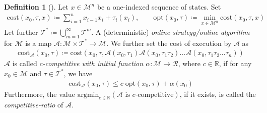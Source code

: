\documentclass[10pt]{amsart}
\theoremstyle{definition}
\newtheorem{definition}{Definition}
\theoremstyle{remark}
\begin{document}
    \begin{minipage}{0.33\linewidth}
        \centering
    \end{minipage}

    \begin{definition}[{\cite[p. 76]{Woeginger}}]
        Let \(x \in \mathcal{M}^n\) be a one-indexed sequence of states. Set
        \begin{align}
            \text{cost}(x_0, \tau, x) \coloneqq \sum_{i=1}^n x_{i-1}x_i + \tau_i(x_i), \qquad \text{opt}(x_0, \tau) \coloneqq \min_{x \in \mathcal{M}^n} \text{cost}(x_0, \tau, x)
        \end{align}
        Let further \(\mathcal{T}^* \coloneqq \bigcup_{m=1}^\infty \mathcal{T}^m\). A (deterministic) \emph{online strategy/online algorithm} for \(\mathcal{M}\) is a map \(\mathcal{A}\colon \mathcal{M} \times \mathcal{T}^* \to \mathcal{M}\). We further set the cost of execution by \(\mathcal{A}\) as
        \begin{align}
            \text{cost}_{\mathcal{A}}(x_0, \tau) \coloneqq \text{cost}(x_0, \tau, \mathcal{A}(x_0, \tau_1)\mathcal{A}(x_0, \tau_1\tau_2)...\mathcal{A}(x_0, \tau_1\tau_2...\tau_n))
        \end{align}
        \(\mathcal{A}\) is called \emph{\(c\)-competitive with initial function \(\alpha\colon \mathcal{M} \to \mathcal{R}\)}, where \(c \in \mathbb{R}\), if for any \(x_0 \in \mathcal{M}\) and \(\tau \in \mathcal{T}^*\), we have
        \begin{align}
            \text{cost}_{\mathcal{A}}(x_0, \tau) \leq c \; \text{opt}(x_0, \tau) + \alpha(x_0)
        \end{align}
        Furthermore, the value \(\text{argmin}_{c \in \mathbb{R}} (\mathcal{A} \text{ is } c \text{-competitive})\), if it exists, is called the \emph{competitive-ratio} of \(\mathcal{A}\).
    \end{definition}
\end{document}
